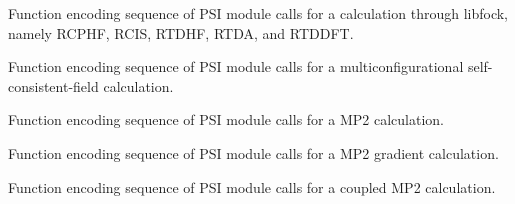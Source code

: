 \documentclass[letterpaper,10pt,english]{sphinxmanual}
\begin{document}

\begin{fulllineitems}
\label{index:proc.run_libfock}
Function encoding sequence of PSI module calls for
a calculation through libfock, namely RCPHF,
RCIS, RTDHF, RTDA, and RTDDFT.

\end{fulllineitems}


\begin{fulllineitems}
\label{index:proc.run_mcscf}
Function encoding sequence of PSI module calls for
a multiconfigurational self-consistent-field calculation.

\end{fulllineitems}


\begin{fulllineitems}
\label{index:proc.run_mp2}
Function encoding sequence of PSI module calls for
a MP2 calculation.

\end{fulllineitems}


\begin{fulllineitems}
\label{index:proc.run_mp2_gradient}
Function encoding sequence of PSI module calls for
a MP2 gradient calculation.

\end{fulllineitems}


\begin{fulllineitems}
\label{index:proc.run_mp2c}
Function encoding sequence of PSI module calls for
a coupled MP2 calculation.

\end{fulllineitems}

\end{document}
